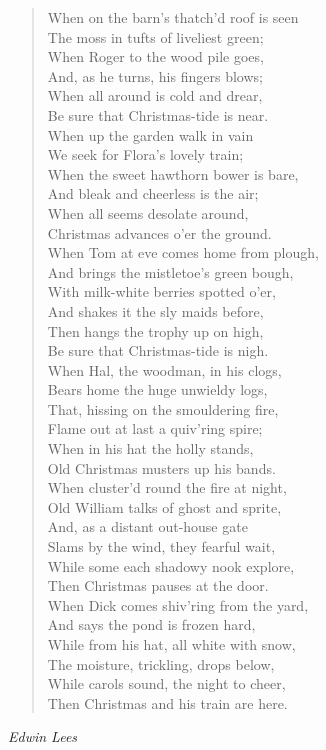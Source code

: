 
\begin{verse}
When on the barn's thatch'd roof is seen\\
The moss in tufts of liveliest green;\\
When Roger to the wood pile goes,\\
And, as he turns, his fingers blows;\\
When all around is cold and drear,\\
Be sure that Christmas-tide is near.\\[0.7em]

When up the garden walk in vain\\
We seek for Flora's lovely train;\\
When the sweet hawthorn bower is bare,\\
And bleak and cheerless is the air;\\
When all seems desolate around,\\
Christmas advances o'er the ground.\\[0.7em]

When Tom at eve comes home from plough,\\
And brings the mistletoe's green bough,\\
With milk-white berries spotted o'er,\\
And shakes it the sly maids before,\\
Then hangs the trophy up on high,\\
Be sure that Christmas-tide is nigh.\\[0.7em]

When Hal, the woodman, in his clogs,\\
Bears home the huge unwieldy logs,\\
That, hissing on the smouldering fire,\\
Flame out at last a quiv'ring spire;\\
When in his hat the holly stands,\\
Old Christmas musters up his bands.\\[0.7em]

When cluster'd round the fire at night,\\
Old William talks of ghost and sprite,\\
And, as a distant out-house gate\\
Slams by the wind, they fearful wait,\\
While some each shadowy nook explore,\\
Then Christmas pauses at the door.\\[0.7em]

When Dick comes shiv'ring from the yard,\\
And says the pond is frozen hard,\\
While from his hat, all white with snow,\\
The moisture, trickling, drops below,\\
While carols sound, the night to cheer,\\
Then Christmas and his train are here.%
\end{verse}

\vspace{0.5\baselineskip}
\noindent\textit{Edwin Lees}

\newpage

